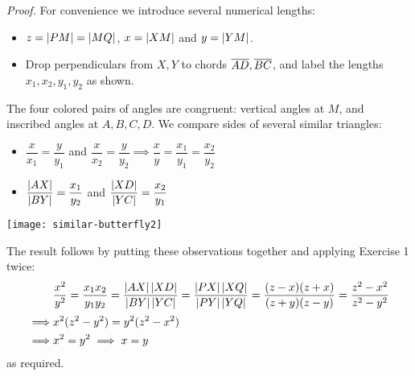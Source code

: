 \begin{tcolorbox}[proofstyle]
	\begin{minipage}[t]{0.58\linewidth}\vspace{0pt}
		\emph{Proof.}\lstsp
		For convenience we introduce several numerical lengths:
		\begin{itemize}
		  \item $z=\left| PM\right|=\left| MQ\right|$, $x=\left| XM\right|$ and $y=\left| YM\right|$.
		  \item Drop perpendiculars from $X,Y$ to chords $\overline{AD},\overline{BC}$, and label the lengths $x_1,x_2,y_1,y_2$ as shown.
		\end{itemize}
		The four colored pairs of angles are congruent: vertical angles at $M$, and inscribed angles at $A,B,C,D$.\smallbreak
		We compare sides of several similar triangles:
		\begin{itemize}
		  \item $\dfrac{x}{x_1}=\dfrac{y}{y_1}$ and $\dfrac{x}{x_2}=\dfrac{y}{y_2} \implies \dfrac xy=\dfrac{x_1}{y_1}=\dfrac{x_2}{y_2}$
		  \item $\dfrac{\left| AX\right|}{\left| BY\right|}=\dfrac{x_1}{y_2}$ and $\dfrac{\left| XD\right|}{\left| YC\right|}=\dfrac{x_2}{y_1}$
		\end{itemize}
	\end{minipage}
	\hfill
	\begin{minipage}[t]{0.39\linewidth}\vspace{0pt}
		\flushright
		\texttt{[image: similar-butterfly2]}
	\end{minipage}\medbreak
	The result follows by putting these observations together and applying Exercise 1 twice:\footnotemark
	\begin{align*}
		&\frac{x^2}{y^2}=\frac{x_1x_2}{y_1y_2}=\frac{\nm{AX}\nm{XD}}{\nm{BY}\nm{YC}} =\frac{\nm{PX}\nm{XQ}}{\nm{PY}\nm{YQ}} =\frac{(z-x)(z+x)}{(z+y)(z-y)} =\frac{z^2-x^2}{z^2-y^2}\\[2pt]
		\implies & x^2(z^2-y^2)=y^2(z^2-x^2)\\
		\implies &x^2=y^2\implies x=y%
	\end{align*}
	as required.\hfill\qedsymbol
\end{tcolorbox}


\vfil

